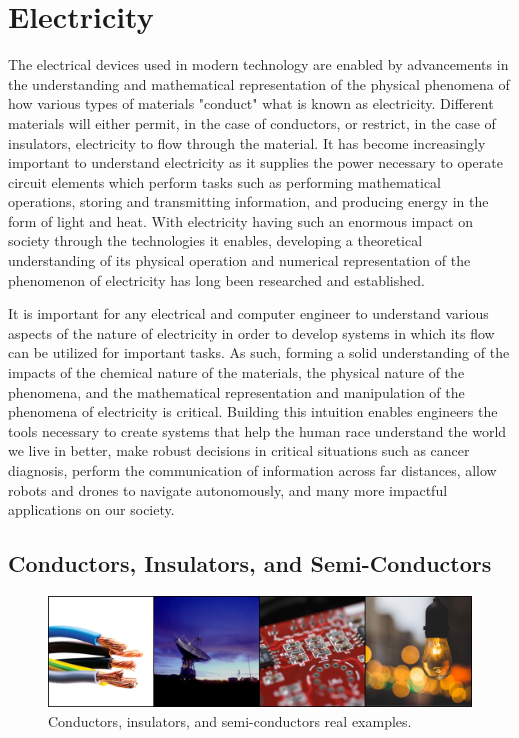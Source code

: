 \documentclass[12pt]{article}
\begin{document}
\MakeLabPrelimTop

\section{Electricity}

The electrical devices used in modern technology are enabled by advancements in the understanding and mathematical representation of the physical phenomena of how various types of materials "conduct" what is known as electricity. Different materials will either permit, in the case of conductors, or restrict, in the case of insulators, electricity to flow through the material. It has become increasingly important to understand electricity as it supplies the power necessary to operate circuit elements which perform tasks such as performing mathematical operations, storing and transmitting information, and producing energy in the form of light and heat. With electricity having such an enormous impact on society through the technologies it enables, developing a theoretical understanding of its physical operation and numerical representation of the phenomenon of electricity has long been researched and established. 

It is important for any electrical and computer engineer to understand various aspects of the nature of electricity in order to develop systems in which its flow can be utilized for important tasks. As such, forming a solid understanding of the impacts of the chemical nature of the materials, the physical nature of the phenomena, and the mathematical representation and manipulation of the phenomena of electricity is critical. Building this intuition enables engineers the tools necessary to create systems that help the human race understand the world we live in better, make robust decisions in critical situations such as cancer diagnosis, perform the communication of information across far distances, allow robots and drones to navigate autonomously, and many more impactful applications on our society. 

\subsection{Conductors, Insulators, and Semi-Conductors}

\begin{figure}[H]
    \centering
    \includegraphics[width=15cm]{photos/prelim/conductorsexamples.png}
    \caption{Conductors, insulators, and semi-conductors real examples.}
\end{figure}
\end{document}
